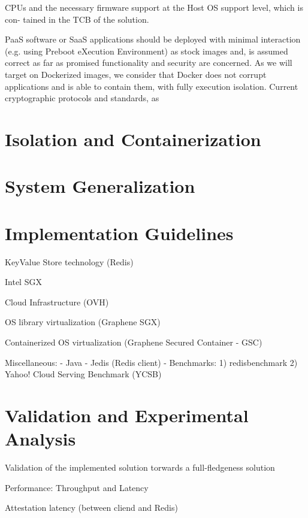 CPUs and the necessary firmware support at the Host OS support level, which is con-
tained in the TCB of the solution.

PaaS software or SaaS applications should be deployed with minimal interaction (e.g.
using Preboot eXecution Environment) as stock images and, is assumed correct as far
as promised functionality and security are concerned. As we will target on Dockerized
images, we consider that Docker does not corrupt applications and is able to contain
them, with fully execution isolation. Current cryptographic protocols and standards, as


\section{Isolation and Containerization} %
\label{sec:importing_images}


\section{System Generalization} %



\section{Implementation Guidelines} %

KeyValue Store technology (Redis)

Intel SGX

Cloud Infrastructure (OVH)

OS library virtualization (Graphene SGX)

Containerized OS virtualization (Graphene Secured Container - GSC)

Miscellaneous: - Java
			   - Jedis (Redis client)
			   - Benchmarks: 1) redisbenchmark
			   				 2) Yahoo! Cloud Serving Benchmark (YCSB)

\section{Validation and Experimental Analysis} %
\label{sec:floats_figures_and_captions}

Validation of the implemented solution torwards a full-fledgeness solution

Performance: Throughput and Latency

Attestation latency (between cliend and Redis)

